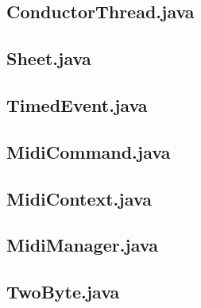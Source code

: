 \subsection{ ConductorThread.java }

\subsection{ Sheet.java }

\subsection{ TimedEvent.java }

\subsection{ MidiCommand.java }

\subsection{ MidiContext.java }

\subsection{ MidiManager.java }

\subsection{ TwoByte.java }

